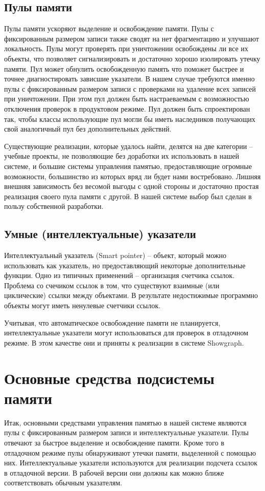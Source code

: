 \documentclass{article}
\begin{document}
\subsection{Пулы памяти}
Пулы памяти ускоряют выделение и освобождение памяти. Пулы с фиксированным размером записи также сводят на нет фрагментацию и улучшают локальность. Пулы могут проверять при уничтожении освобождены ли все их объекты, что позволяет сигнализировать и достаточно хорошо изолировать утечку памяти. Пул может обнулить освобожденную память что поможет быстрее и точнее диагностировать зависшие указатели.  В нашем случае требуются именно пулы с фиксированным размером записи с проверками на удаление всех записей при уничтожении. При этом пул должен быть настраеваемым с возможностью отключения проверок в продуктовом режиме. Пул должен быть спроектирован так, чтобы классы использующие пул могли бы иметь наследников получающих свой аналогичный пул без дополнительных действий.

Существующие реализации, которые удалось найти, делятся на две категории -- учебные проекты, не позволяющие без доработки их использовать в нашей системе, и большие системы управления памятью, предоставляющие огромные возможности, большинство из которых вряд ли будет нами востребовано. Лишняя внешняя зависимость без весомой выгоды с одной стороны и достаточно простая реализация своего пула памяти с другой. В нашей системе выбор был сделан в пользу собственной разработки.

\subsection{Умные (интеллектуальные) указатели}
Интеллектуальный указатель (Smart pointer) -- объект, который можно использовать как указатель, но предоставляющий некоторые дополнительные функции. Одно из типичных применений -- организация счетчика ссылок. Проблема со счечиком ссылок в том, что существуют взаимные (или циклические) ссылки между объектами. В результате недостижимые программно объекты могут иметь ненулевые счетчики ссылок.

Учитывая, что автоматическое освобождение памяти не планируется, интеллектуальные указатели могут использоваться для проверок в отладочном режиме. В этом качестве они и приняты к реализации в системе Showgraph.

\section{Основные средства подсистемы памяти}
Итак, основными средствами управления памятью в нашей системе являются пулы с фиксированным размером записи и интеллектуальные указатели. Пулы отвечают за быстрое выделение и освобождение памяти. Кроме того в отладочном режиме пулы обнаруживают утечки памяти, выделенной с помощью них. Интеллектуальные указатели используются для реализации подсчета ссылок в отладочной версии. В рабочей версии они должны как можно ближе соответствовать обычным указателям.
\end{document}
